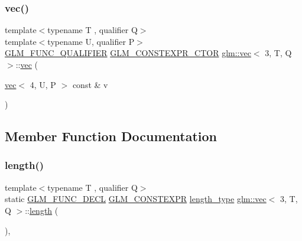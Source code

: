 \mbox{\label{structglm_1_1vec_3_013_00_01_t_00_01_q_01_4_a71c4b9fad3b06926109f1f8fa74f6064}} 
\subsubsection{\texorpdfstring{vec()}{vec()}\hspace{0.1cm}{\footnotesize\ttfamily [23/23]}}
{\footnotesize\ttfamily template$<$typename T , qualifier Q$>$ \\
template$<$typename U, qualifier P$>$ \\
\mbox{\hyperlink{setup_8hpp_a33fdea6f91c5f834105f7415e2a64407}{G\+L\+M\+\_\+\+F\+U\+N\+C\+\_\+\+Q\+U\+A\+L\+I\+F\+I\+ER}} \mbox{\hyperlink{setup_8hpp_ad34178a09666081abdb573c14d1f4a5a}{G\+L\+M\+\_\+\+C\+O\+N\+S\+T\+E\+X\+P\+R\+\_\+\+C\+T\+OR}} \mbox{\hyperlink{structglm_1_1vec}{glm\+::vec}}$<$ 3, T, Q $>$\+::\mbox{\hyperlink{structglm_1_1vec}{vec}} (\begin{DoxyParamCaption}\item[{\mbox{\hyperlink{structglm_1_1vec}{vec}}$<$ 4, U, P $>$ const \&}]{v }\end{DoxyParamCaption})}



\subsection{Member Function Documentation}
\mbox{\label{structglm_1_1vec_3_013_00_01_t_00_01_q_01_4_a0dc7ddc517098d4c8257187df6be4cef}} 
\subsubsection{\texorpdfstring{length()}{length()}}
{\footnotesize\ttfamily template$<$typename T , qualifier Q$>$ \\
static \mbox{\hyperlink{setup_8hpp_ab2d052de21a70539923e9bcbf6e83a51}{G\+L\+M\+\_\+\+F\+U\+N\+C\+\_\+\+D\+E\+CL}} \mbox{\hyperlink{setup_8hpp_a08b807947b47031d3a511f03f89645ad}{G\+L\+M\+\_\+\+C\+O\+N\+S\+T\+E\+X\+PR}} \mbox{\hyperlink{structglm_1_1vec_3_013_00_01_t_00_01_q_01_4_ab586a87f82719bfdd180336a98843257}{length\+\_\+type}} \mbox{\hyperlink{structglm_1_1vec}{glm\+::vec}}$<$ 3, T, Q $>$\+::\mbox{\hyperlink{_s_d_l__opengl__glext_8h_ab9c919755bde3b34349e23a32b4e0fa7}{length}} (\begin{DoxyParamCaption}{ }\end{DoxyParamCaption})\hspace{0.3cm}{\ttfamily [inline]}, {\ttfamily [static]}}

